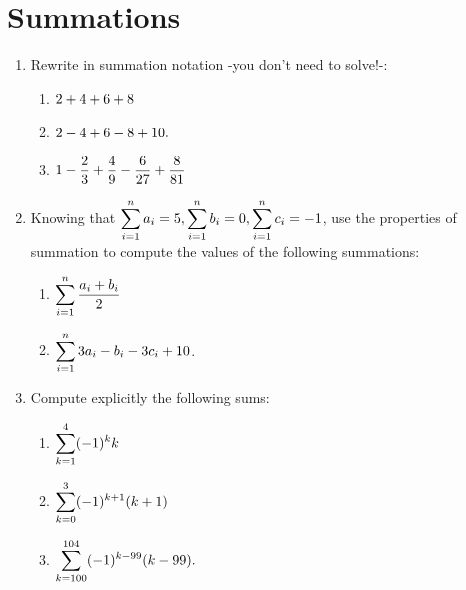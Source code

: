 \documentclass[10pt]{article}
\begin{document}
\section{Summations}
\begin{enumerate}

    
    \item Rewrite in summation notation -you don't need to solve!-:
    \begin{enumerate}
        \item $\displaystyle 2 + 4 + 6 + 8 $
        \item $\displaystyle 2 - 4 + 6 - 8 + 10.$
        \item $\displaystyle 1-\frac{2}{3}+\frac{4}{9}-\frac{6}{27}+\frac{8}{81} $


    \end{enumerate}

    \item Knowing that $\displaystyle \sum_{i=1}^{n}a_i=5,\sum_{i=1}^{n}b_i=0,\sum_{i=1}^{n}c_i=-1$, use the properties of summation to compute the values of the following summations:
    \begin{enumerate}
        \item $\displaystyle \sum_{i=1}^n \frac{a_i+b_i}{2}$
        \item $\displaystyle \sum_{i=1}^n 3a_i-b_i-3c_i+10$.
    \end{enumerate}
        \item Compute explicitly the following sums: 
    \begin{enumerate}
        \item $\displaystyle \sum_{k = 1}^4 (-1)^k k$
        \item $\displaystyle \sum_{k = 0}^3 (-1)^{k+1} (k+1)$
        \item $\displaystyle \sum_{k = 100}^{104} (-1)^{k-99} (k-99).$
    \end{enumerate}
    \end{enumerate}










\newpage
\end{document}
